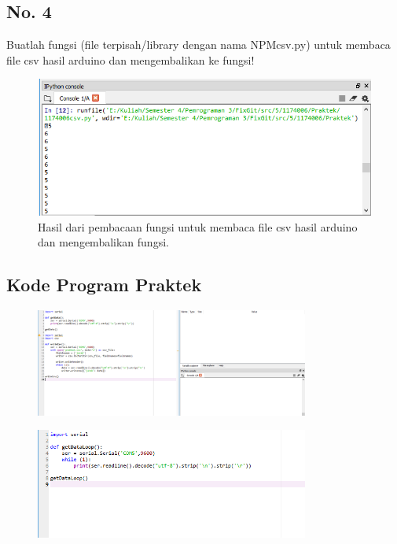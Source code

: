 \subsection{ No. 4}
Buatlah fungsi (file terpisah/library dengan nama NPMcsv.py) untuk membaca file csv hasil arduino dan mengembalikan ke fungsi!


\begin{figure}[H]
	\includegraphics[width=12cm]{figures/5/1174086/Praktek/4.png}
	\centering
	\caption{Hasil dari pembacaan fungsi untuk membaca file csv hasil arduino dan mengembalikan fungsi.}
\end{figure}

\subsection{Kode Program Praktek}
\begin{figure}[H]
	\includegraphics[width=9cm]{figures/5/1174086/Praktek/realtime.png}
	\centering
\end{figure}

\begin{figure}[H]
	\includegraphics[width=9cm]{figures/5/1174086/Praktek/save.png}
	\centering
\end{figure}

